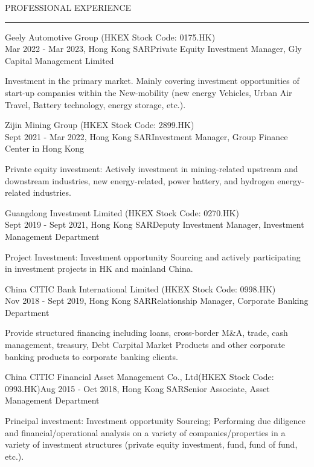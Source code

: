 \documentclass{resume}
\renewenvironment{rSection}[1]{
\Needspace{5\baselineskip}
\sectionskip
\textcolor{RoyalPurple}{\MakeUppercase{#1}}
\sectionlineskip
\hrule
\begin{list}{}{
\setlength{\leftmargin}{1.5em}
}
\item[]
}{
\end{list}
}
\begin{document}
\begin{rSection}{Professional Experience}

\begin{rSubsection}{Geely Automotive Group (HKEX Stock Code: 0175.HK)}{  \\  Mar 2022 - Mar 2023, Hong Kong SAR}{\textcolor{RoyalPurple}{Private Equity Investment Manager, Gly Capital Management Limited}}{}
\item  Investment in the primary market. Mainly covering investment opportunities of start-up companies within the New-mobility (new energy Vehicles, Urban Air Travel, Battery technology, energy storage, etc.).

\end{rSubsection}

\begin{rSubsection}{Zijin Mining Group (HKEX Stock Code: 2899.HK)}{ \\ Sept 2021 - Mar 2022, Hong Kong SAR}{\textcolor{RoyalPurple}{Investment Manager, Group Finance Center in Hong Kong}}{}
\item Private equity investment: Actively investment in mining-related upstream and downstream industries, new energy-related, power battery, and hydrogen energy-related industries.
\end{rSubsection}

\begin{rSubsection}{Guangdong Investment Limited (HKEX Stock Code: 0270.HK)}{ \\ Sept 2019 - Sept 2021, Hong Kong SAR}{\textcolor{RoyalPurple}{Deputy Investment Manager, Investment Management Department}}{}
\item Project Investment: Investment opportunity Sourcing and actively participating in investment projects in HK and mainland China.
\end{rSubsection}

\begin{rSubsection}{China CITIC Bank International Limited (HKEX Stock Code: 0998.HK)}{ \\ Nov 2018 - Sept 2019, Hong Kong SAR}{\textcolor{RoyalPurple}{Relationship Manager, Corporate Banking Department}}{}
\item Provide structured financing including loans, cross-border M\&A, trade, cash management, treasury, Debt Carpital Market Products and other corporate banking products to corporate banking clients.
\end{rSubsection}

\begin{rSubsection}{China CITIC Financial Asset Management Co., Ltd(HKEX Stock Code: 0993.HK)}{Aug 2015 - Oct 2018, Hong Kong SAR}{\textcolor{RoyalPurple}{Senior Associate, Asset Management Department}}{}
\item Principal investment: Investment opportunity Sourcing; Performing due diligence and financial/operational analysis on a variety of companies/properties in a variety of investment structures (private equity investment, fund, fund of fund, etc.).

\end{rSubsection}

\end{rSection}
\end{document}
